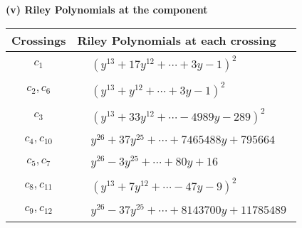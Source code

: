 \documentclass[1p]{elsarticle_modified}
\theoremstyle{definition}
\begin{document}
\flushleft \textbf{(v) Riley Polynomials at the component}\newline \\
\begin{tabular}{m{50pt}|m{274pt}}
Crossings & \hspace{64pt}Riley Polynomials at each crossing \\
\hline $$\begin{aligned}c_{1}\end{aligned}$$&$\begin{aligned}
&(y^{13}+17 y^{12}+\cdots+3 y-1)^{2}
\end{aligned}$\\
\hline $$\begin{aligned}c_{2},c_{6}\end{aligned}$$&$\begin{aligned}
&(y^{13}+y^{12}+\cdots+3 y-1)^{2}
\end{aligned}$\\
\hline $$\begin{aligned}c_{3}\end{aligned}$$&$\begin{aligned}
&(y^{13}+33 y^{12}+\cdots-4989 y-289)^{2}
\end{aligned}$\\
\hline $$\begin{aligned}c_{4},c_{10}\end{aligned}$$&$\begin{aligned}
&y^{26}+37 y^{25}+\cdots+7465488 y+795664
\end{aligned}$\\
\hline $$\begin{aligned}c_{5},c_{7}\end{aligned}$$&$\begin{aligned}
&y^{26}-3 y^{25}+\cdots+80 y+16
\end{aligned}$\\
\hline $$\begin{aligned}c_{8},c_{11}\end{aligned}$$&$\begin{aligned}
&(y^{13}+7 y^{12}+\cdots-47 y-9)^{2}
\end{aligned}$\\
\hline $$\begin{aligned}c_{9},c_{12}\end{aligned}$$&$\begin{aligned}
&y^{26}-37 y^{25}+\cdots+8143700 y+11785489
\end{aligned}$\\
\hline
\end{tabular}\\~\\
\end{document}
